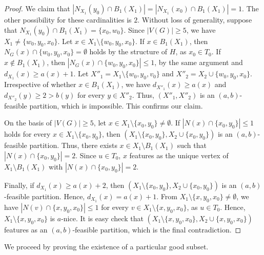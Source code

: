 \documentclass[11p]{elsarticle}
\theoremstyle{definition}
\begin{document}
\begin{proof}
We claim that  $|N_{X_1}(y_0)\cap B_1(X_1)|=|N_{X_1}(x_0)\cap B_1(X_1)|=1$. The other possibility for these cardinalities is $2$. Without loss of generality, suppose that   $ N_{X_1}(y_0)\cap B_1(X_1)=\{x_0,w_0\} $.
Since $|V(G)|\ge 5$, we have  $X_1\ne \{w_0,y_0,x_0\}$.
Let $x\in X_1\setminus \{w_0,y_0,x_0\}$. If $x\in B_1(X_1)$, then $N_G(x)\cap \{w_0,y_0,x_0\}=\emptyset$ holds by the structure of $H$, as $x_0\in T_0$. If   $x\not\in B_1(X_1)$, then $|N_G(x)\cap \{w_0,y_0,x_0\}|\le 1$, by the same argument  and $d_{X_1}(x)\ge a(x)+1$. Let $X''_1=X_1\setminus \{w_0,y_0,v_0\}$ and $X''_2=X_2\cup \{w_0,y_0,x_0\}$. Irrespective of whether $x\in B_1(X_1)$, we have $d_{X''_1}(x)\ge a(x)$ and $d_{X''_2}(y)\ge 2>b(y)$ for every $y\in X''_2$. Thus, $(X''_1, X''_2)$ is an $(a, b) $-feasible partition, which is impossible. This confirms our claim.

  On the basis of $ |V(G)|\ge 5 $, let $x\in X_1\setminus\{x_0,y_0\}\neq\emptyset $.
  If $ \left| N(x)\cap \{x_0,y_0\}\right|\le 1$ holds  for every $x\in X_1\setminus\{x_0,y_0\}$, then     $(X_1\setminus\{x_0,y_0\}, X_2\cup\{x_0,y_0\})$ is an $ (a,b) $-feasible partition. Thus, there exists   $x\in X_1\setminus B_1(X_1)$ such that  $ \left| N(x)\cap \{x_0,y_0\}\right|=2$.   Since $u\in T_0$,  $x$ features as the unique vertex of  $ X_1\setminus B_1(X_1) $ with  $ \left| N(x)\cap \{x_0,y_0\}\right|=2$.

  Finally, if $ d_{X_1}(x)\ge a(x)+2 $, then $ (X_1\setminus\{x_0,y_0\}, X_2\cup\{x_0,y_0\}) $ is an $ (a,b) $-feasible partition. Hence, $d_{X_1}(x)=a(x)+1 $. From $ X_1\setminus\{x,y_0,x_0\}\neq\emptyset $, we have $ \left|N(v)\cap\{x,y_0,x_0\} \right|\le 1 $ for every $ v\in X_1\setminus\{x,y_0,x_0\}$, as $u\in T_0$. Hence, $ X_1\setminus\{x,y_0,x_0\} $ is $ a $-nice. It  is easy check  that $(X_1\setminus\{x,y_0,x_0\}, X_2\cup \{x,y_0,x_0\})$ features as an $(a,b)$-feasible partition, which is the final contradiction. \end{proof}

We proceed by proving the existence of a particular good subset.
\end{document}
